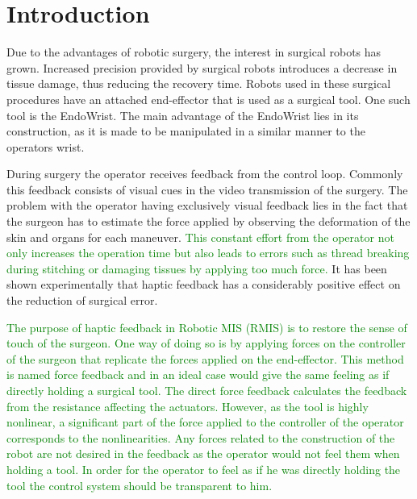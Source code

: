 \section{Introduction}\label{sec:introduction}
Due to the advantages of robotic surgery, the interest in surgical robots has grown\cite{forbes}.
Increased precision provided by surgical robots introduces a decrease in tissue damage, thus reducing the recovery time\cite{RIGSP}.
Robots used in these surgical procedures have an attached end-effector that is used as a surgical tool.
One such tool is the EndoWrist.
The main advantage of the EndoWrist lies in its construction, as it is made to be manipulated in a similar manner to the operators wrist.

During surgery the operator receives feedback from the control loop. Commonly this feedback consists of visual cues in the video transmission of the surgery.
The problem with the operator having exclusively visual feedback lies in the fact that the surgeon has to estimate the force applied by observing the deformation of the skin and organs for each maneuver. \textcolor{green}{This constant effort from the operator not only increases the operation time but also leads to errors such as thread breaking during stitching or damaging tissues by applying too much force.} It has been shown experimentally that haptic feedback has a considerably positive effect on the reduction of surgical error\cite{EOFGFF}.

\textcolor{green}{The purpose of haptic feedback in Robotic MIS (RMIS) is to restore the sense of touch of the surgeon. One way of doing so is by applying forces on the controller of the surgeon that replicate the forces applied on the end-effector. This method is named force feedback and in an ideal case would give the same feeling as if directly holding a surgical tool. The direct force feedback calculates the feedback from the resistance affecting the actuators. However, as the tool is highly nonlinear, a significant part of the force applied to the controller of the operator corresponds to the nonlinearities. Any forces related to the construction of the robot are not desired in the feedback as the operator would not feel them when holding a tool. In order for the operator to feel as if he was directly holding the tool the control system should be transparent to him.}

